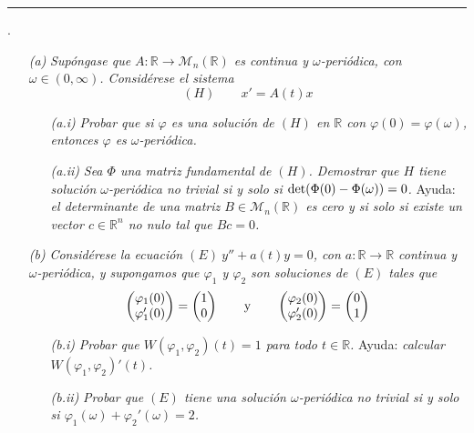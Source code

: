 \documentclass[11pt]{report}
\newcommand{\R}{\mathbb R}
\begin{document}
\vspace{2mm}

\hrule

\vspace{4mm}

. \begin{itemize}
    \item[\textit{(a)}] \textit{Supóngase que $A \colon \R \to \mathcal{M}_n(\R)$ es continua y $\omega$-periódica, con $\omega \in(0,\infty)$. Considérese el sistema}
    \[(H) \qquad x'=A(t)x\]
    \begin{itemize}
        \item[\textit{(a.i)}] \textit{Probar que si $\varphi$ es una solución de $(H)$ en $\R$ con $\varphi(0)=\varphi(\omega)$, entonces $\varphi$ es $\omega$-periódica.}
        \item[\textit{(a.ii)}] \textit{Sea $\Phi$ una matriz fundamental de $(H)$. Demostrar que $H$ tiene solución $\omega$-periódica no trivial si y solo si $\textup{det}(\Phi(0)-\Phi(\omega))=0$.} Ayuda: \textit{el determinante de una matriz $B \in \mathcal{M}_n(\R)$ es cero y si solo si existe un vector $c \in \R^n$ no nulo tal que $Bc=0$.}
    \end{itemize}
    \item[\textit{(b)}] \textit{Considérese la ecuación $(E) \ y''+a(t)y=0$, con $a \colon \R \to \R$ continua y $\omega$-periódica, y supongamos que $\varphi_1$ y $\varphi_2$ son soluciones de $(E)$ tales que}
    \[\begin{pmatrix}
        \varphi_1(0) \\
        \varphi'_1(0)
    \end{pmatrix}=\begin{pmatrix}
        1 \\
        0
    \end{pmatrix} \qquad \textup{y} \qquad \begin{pmatrix}
        \varphi_2(0) \\
        \varphi'_2(0)
    \end{pmatrix}=\begin{pmatrix}
        0 \\
        1
    \end{pmatrix}\]
    \begin{itemize}
        \item[\textit{(b.i)}] \textit{Probar que $W(\varphi_1,\varphi_2)(t)=1$ para todo $t \in \R$.} Ayuda: \textit{calcular $W(\varphi_1,\varphi_2)'(t)$.}
        \item[\textit{(b.ii)}] \textit{Probar que $(E)$ tiene una solución $\omega$-periódica no trivial si y solo si $\varphi_1(\omega)+\varphi_2'(\omega)=2$.}
    \end{itemize}
\end{itemize}
\end{document}
